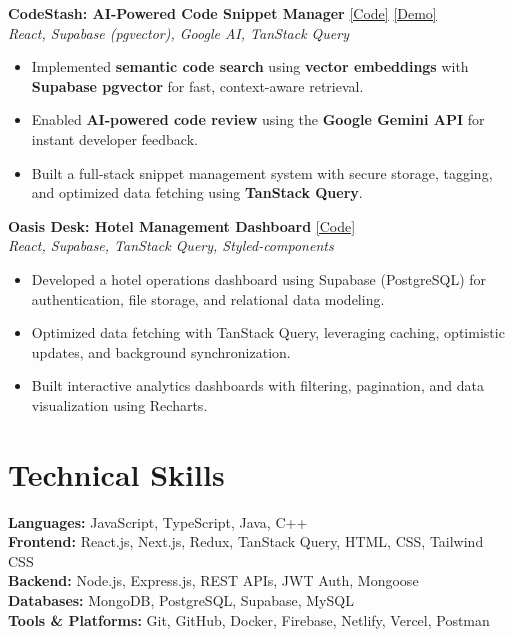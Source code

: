 \documentclass[10pt, a4paper]{article}
\begin{document}
\textbf{CodeStash: AI-Powered Code Snippet Manager} \hfill \href{https://github.com/kryonic-fluke/code_snippet_manager}{[Code]} \href{https://codestashin.netlify.app}{[Demo]} \\
\textit{React, Supabase (pgvector), Google AI, TanStack Query}
\begin{itemize}[leftmargin=*, itemsep=2pt, topsep=2pt]
\item Implemented \textbf{semantic code search} using \textbf{vector embeddings} with \textbf{Supabase pgvector} for fast, context-aware retrieval.
\item Enabled \textbf{AI-powered code review} using the \textbf{Google Gemini API} for instant developer feedback.
\item Built a full-stack snippet management system with secure storage, tagging, and optimized data fetching using \textbf{TanStack Query}.
\end{itemize}

\textbf{Oasis Desk: Hotel Management Dashboard} \hfill \href{https://github.com/kryonic-fluke/WildOasisSPA}{[Code]} \\
\textit{React, Supabase, TanStack Query, Styled-components}
\begin{itemize}[leftmargin=*, itemsep=2pt, topsep=2pt]
\item Developed a hotel operations dashboard using Supabase (PostgreSQL) for authentication, file storage,
and relational data modeling.
\item Optimized data fetching with TanStack Query, leveraging caching, optimistic updates, and background
synchronization.
\item Built interactive analytics dashboards with filtering, pagination, and data visualization using Recharts.
\end{itemize}

\section*{Technical Skills}
\textbf{Languages:} JavaScript, TypeScript, Java, C++ \\
\textbf{Frontend:} React.js, Next.js, Redux, TanStack Query, HTML, CSS, Tailwind CSS \\
\textbf{Backend:} Node.js, Express.js, REST APIs, JWT Auth, Mongoose \\
\textbf{Databases:} MongoDB, PostgreSQL, Supabase, MySQL \\
\textbf{Tools \& Platforms:} Git, GitHub, Docker, Firebase, Netlify, Vercel, Postman
\end{document}
